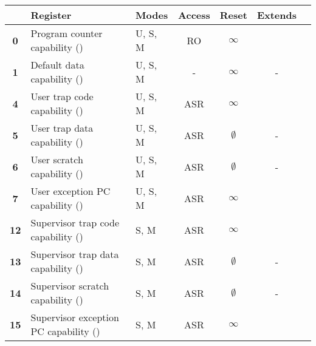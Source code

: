 
\begin{table}[h!]
\centering
\begin{tabular}{cllcccc@{}}
\toprule
& \textbf{Register} & \textbf{Modes} & \textbf{Access} & \textbf{Reset} & \textbf{Extends} \\ \midrule
\textbf{0} & Program counter capability (\PCC{})     & U, S, M & RO & $\infty$ & \PC{} \\
\textbf{1} & Default data capability (\DDC{})        & U, S, M & -  & $\infty$ & -     \\
[1.5em]
\textbf{4} & User trap code capability (\UTCC{})     & U, S, M & ASR & $\infty$    & \utvec{} \\
\textbf{5} & User trap data capability (\UTDC{})     & U, S, M & ASR & $\emptyset$ & -        \\
\textbf{6} & User scratch capability (\UScratchC{})  & U, S, M & ASR & $\emptyset$ & -        \\
\textbf{7} & User exception PC capability (\UEPCC{}) & U, S, M & ASR & $\infty$    & \uepc{} \\
[1.5em]

\textbf{12} & Supervisor trap code capability (\STCC{})     & S, M & ASR & $\infty$    & \stvec{} \\
\textbf{13} & Supervisor trap data capability (\STDC{})     & S, M & ASR & $\emptyset$ & -        \\
\textbf{14} & Supervisor scratch capability (\SScratchC{})  & S, M & ASR & $\emptyset$ & -        \\
\textbf{15} & Supervisor exception PC capability (\SEPCC{}) & S, M & ASR & $\infty$    & \sepc{}  \\
[1.5em]


\end{tabular}
\end{table}
